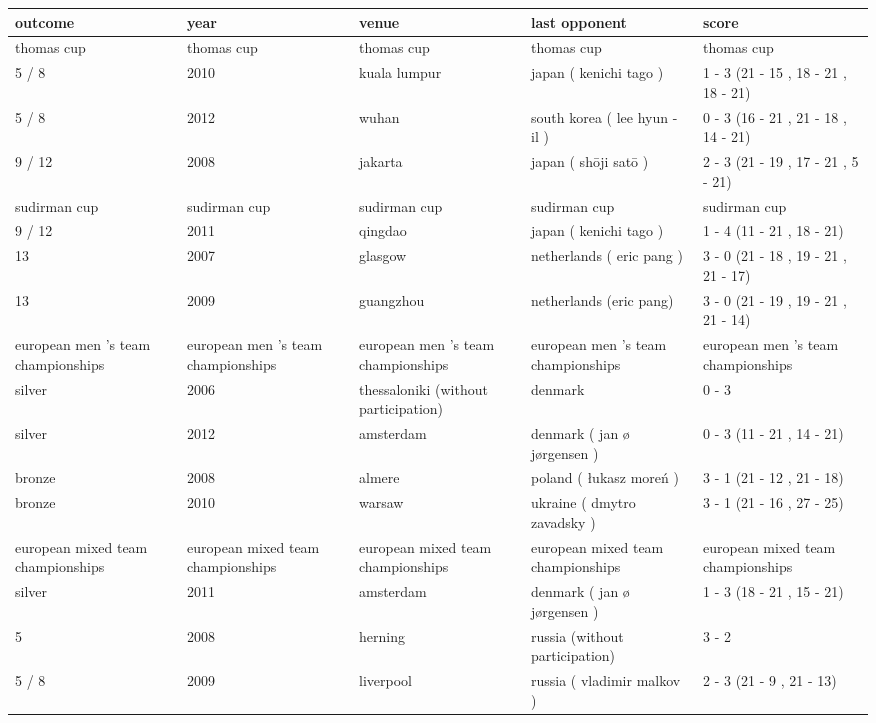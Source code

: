 \documentclass{article}
\begin{document}
\begin{tabular}{lllll}
\toprule
outcome & year & venue & last opponent & score \\
\midrule
thomas cup & thomas cup & thomas cup & thomas cup & thomas cup \\
5 / 8 & 2010 & kuala lumpur & japan ( kenichi tago ) & 1 - 3 (21 - 15 , 18 - 21 , 18 - 21) \\
5 / 8 & 2012 & wuhan & south korea ( lee hyun - il ) & 0 - 3 (16 - 21 , 21 - 18 , 14 - 21) \\
9 / 12 & 2008 & jakarta & japan ( shōji satō ) & 2 - 3 (21 - 19 , 17 - 21 , 5 - 21) \\
sudirman cup & sudirman cup & sudirman cup & sudirman cup & sudirman cup \\
9 / 12 & 2011 & qingdao & japan ( kenichi tago ) & 1 - 4 (11 - 21 , 18 - 21) \\
13 & 2007 & glasgow & netherlands ( eric pang ) & 3 - 0 (21 - 18 , 19 - 21 , 21 - 17) \\
13 & 2009 & guangzhou & netherlands (eric pang) & 3 - 0 (21 - 19 , 19 - 21 , 21 - 14) \\
european men 's team championships & european men 's team championships & european men 's team championships & european men 's team championships & european men 's team championships \\
silver & 2006 & thessaloniki (without participation) & denmark & 0 - 3 \\
silver & 2012 & amsterdam & denmark ( jan ø jørgensen ) & 0 - 3 (11 - 21 , 14 - 21) \\
bronze & 2008 & almere & poland ( łukasz moreń ) & 3 - 1 (21 - 12 , 21 - 18) \\
bronze & 2010 & warsaw & ukraine ( dmytro zavadsky ) & 3 - 1 (21 - 16 , 27 - 25) \\
european mixed team championships & european mixed team championships & european mixed team championships & european mixed team championships & european mixed team championships \\
silver & 2011 & amsterdam & denmark ( jan ø jørgensen ) & 1 - 3 (18 - 21 , 15 - 21) \\
5 & 2008 & herning & russia (without participation) & 3 - 2 \\
5 / 8 & 2009 & liverpool & russia ( vladimir malkov ) & 2 - 3 (21 - 9 , 21 - 13) \\
\bottomrule
\end{tabular}
\end{document}
